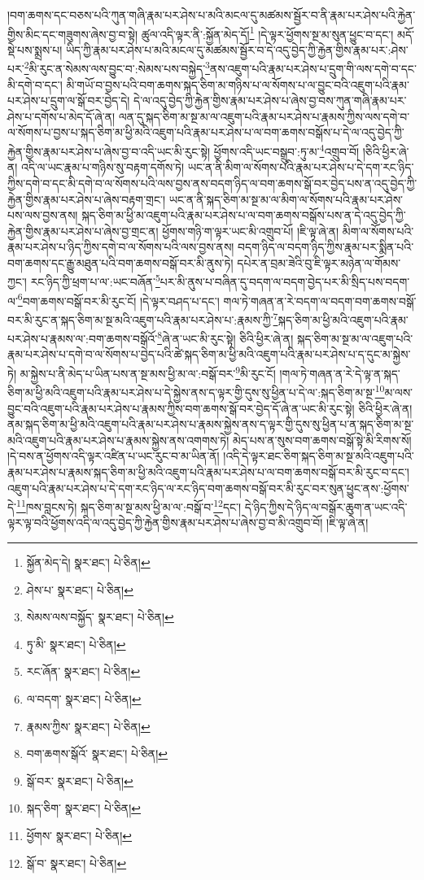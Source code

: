 །བག་ཆགས་དང་བཅས་པའི་ཀུན་གཞི་རྣམ་པར་ཤེས་པ་མའི་མངལ་དུ་མཚམས་སྦྱོར་བ་ནི་རྣམ་པར་ཤེས་པའི་རྐྱེན་གྱིས་མིང་དང་གཟུགས་ཞེས་བྱ་བ་སྟེ། ཚུལ་འདི་ལྟར་ནི་:སྐྱོན་མེད་དོ།\footnote{སྐྱོན་མེད་དེ།  སྣར་ཐང་།  པེ་ཅིན། } །དེ་ལྟར་ཕྱོགས་སྔ་མ་སུན་ཕྱུང་བ་དང་། མདོ་སྡེ་པས་སྨྲས་པ། ཡིད་ཀྱི་རྣམ་པར་ཤེས་པ་མའི་མངལ་དུ་མཚམས་སྦྱོར་བ་དེ་འདུ་བྱེད་ཀྱི་རྐྱེན་གྱིས་རྣམ་པར་:ཤེས་པར་\footnote{ཤེས་པ་  སྣར་ཐང་།  པེ་ཅིན། }མི་རུང་ན་སེམས་ལས་བྱུང་བ་:སེམས་པས་བསྐྱེད་\footnote{སེམས་ལས་བསྐྱོད་  སྣར་ཐང་།  པེ་ཅིན། }ནས་འཇུག་པའི་རྣམ་པར་ཤེས་པ་དྲུག་གི་ལས་དགེ་བ་དང་མི་དགེ་བ་དང་། མི་གཡོ་བ་བྱས་པའི་བག་ཆགས་སྐད་ཅིག་མ་གཉིས་པ་ལ་སོགས་པ་ལ་བྱུང་བའི་འཇུག་པའི་རྣམ་པར་ཤེས་པ་དྲུག་ལ་སྒོ་བར་བྱེད་དེ། དེ་ལ་འདུ་བྱེད་ཀྱི་རྐྱེན་གྱིས་རྣམ་པར་ཤེས་པ་ཞེས་བྱ་བས་ཀུན་གཞི་རྣམ་པར་ཤེས་པ་དགོས་པ་མེད་དོ་ཞེ་ན། ལན་དུ་སྐད་ཅིག་མ་སྔ་མ་ལ་འཇུག་པའི་རྣམ་པར་ཤེས་པ་རྣམས་ཀྱིས་ལས་དགེ་བ་ལ་སོགས་པ་བྱས་པ་སྐད་ཅིག་མ་ཕྱི་མའི་འཇུག་པའི་རྣམ་པར་ཤེས་པ་ལ་བག་ཆགས་བསྒོས་པ་དེ་ལ་འདུ་བྱེད་ཀྱི་རྐྱེན་གྱིས་རྣམ་པར་ཤེས་པ་ཞེས་བྱ་བ་འདི་ཡང་མི་རུང་སྟེ། ཕྱོགས་འདི་ཡང་བསྒྲུབ་:ཏུ་མ་\footnote{ཏུ་མི་  སྣར་ཐང་།  པེ་ཅིན། }འགྲུབ་བོ། །ཅིའི་ཕྱིར་ཞེ་ན། འདི་ལ་ཡང་རྣམ་པ་གཉིས་སུ་བརྟག་དགོས་ཏེ། ཡང་ན་ནི་མིག་ལ་སོགས་པའི་རྣམ་པར་ཤེས་པ་དེ་དག་རང་ཉིད་ཀྱིས་དགེ་བ་དང་མི་དགེ་བ་ལ་སོགས་པའི་ལས་བྱས་ནས་བདག་ཉིད་ལ་བག་ཆགས་སྒོ་བར་བྱེད་པས་ན་འདུ་བྱེད་ཀྱི་རྐྱེན་གྱིས་རྣམ་པར་ཤེས་པ་ཞེས་བརྟག་གྲང་། ཡང་ན་ནི་སྐད་ཅིག་མ་སྔ་མ་ལ་མིག་ལ་སོགས་པའི་རྣམ་པར་ཤེས་པས་ལས་བྱས་ནས། སྐད་ཅིག་མ་ཕྱི་མ་འཇུག་པའི་རྣམ་པར་ཤེས་པ་ལ་བག་ཆགས་བསྒོས་པས་ན་དེ་འདུ་བྱེད་ཀྱི་རྐྱེན་གྱིས་རྣམ་པར་ཤེས་པ་ཞེས་བྱ་གྲང་ན། ཕྱོགས་གཉི་ག་ལྟར་ཡང་མི་འགྲུབ་པོ། །ཇི་ལྟ་ཞེ་ན། མིག་ལ་སོགས་པའི་རྣམ་པར་ཤེས་པ་ཉིད་ཀྱིས་དགེ་བ་ལ་སོགས་པའི་ལས་བྱས་ནས། བདག་ཉིད་ལ་བདག་ཉིད་ཀྱིས་རྣམ་པར་སྨིན་པའི་བག་ཆགས་དང་རྒྱུ་མཐུན་པའི་བག་ཆགས་བསྒོ་བར་མི་ནུས་ཏེ། དཔེར་ན་བྲམ་ཟེའི་བུ་ཇི་ལྟར་མཉེན་ལ་གོམས་ཀྱང་། རང་ཉིད་ཀྱི་ཕྲག་པ་ལ་:ཡང་བཞོན་\footnote{རང་ཞོན་  སྣར་ཐང་།  པེ་ཅིན། }པར་མི་ནུས་པ་བཞིན་དུ་བདག་ལ་བདག་བྱེད་པར་མི་སྲིད་པས་བདག་ལ་\footnote{ལ་བདག་  སྣར་ཐང་།  པེ་ཅིན། }བག་ཆགས་བསྒོ་བར་མི་རུང་ངོ། །དེ་ལྟར་བཤད་པ་དང་། གལ་ཏེ་གཞན་ན་རེ་བདག་ལ་བདག་བག་ཆགས་བསྒོ་བར་མི་རུང་ན་སྐད་ཅིག་མ་སྔ་མའི་འཇུག་པའི་རྣམ་པར་ཤེས་པ་:རྣམས་ཀྱི་\footnote{རྣམས་ཀྱིས་  སྣར་ཐང་།  པེ་ཅིན། }སྐད་ཅིག་མ་ཕྱི་མའི་འཇུག་པའི་རྣམ་པར་ཤེས་པ་རྣམས་ལ་:བག་ཆགས་བསྒོའོ་\footnote{བག་ཆགས་སྒོའོ་  སྣར་ཐང་།  པེ་ཅིན། }ཞེ་ན་ཡང་མི་རུང་སྟེ། ཅིའི་ཕྱིར་ཞེ་ན། སྐད་ཅིག་མ་སྔ་མ་ལ་འཇུག་པའི་རྣམ་པར་ཤེས་པ་དགེ་བ་ལ་སོགས་པ་བྱེད་པའི་ཚེ་སྐད་ཅིག་མ་ཕྱི་མའི་འཇུག་པའི་རྣམ་པར་ཤེས་པ་ད་དུང་མ་སྐྱེས་ཏེ། མ་སྐྱེས་པ་ནི་མེད་པ་ཡིན་པས་ན་སྔ་མས་ཕྱི་མ་ལ་:བསྒོ་བར་\footnote{སྒོ་བར་  སྣར་ཐང་།  པེ་ཅིན། }མི་རུང་ངོ། །གལ་ཏེ་གཞན་ན་རེ་དེ་ལྟ་ན་སྐད་ཅིག་མ་ཕྱི་མའི་འཇུག་པའི་རྣམ་པར་ཤེས་པ་དེ་སྐྱེས་ནས་ད་ལྟར་གྱི་དུས་སུ་ཕྱིན་པ་དེ་ལ་:སྐད་ཅིག་མ་སྔ་\footnote{སྐད་ཅིག་  སྣར་ཐང་།  པེ་ཅིན། }མ་ལས་བྱུང་བའི་འཇུག་པའི་རྣམ་པར་ཤེས་པ་རྣམས་ཀྱིས་བག་ཆགས་སྒོ་བར་བྱེད་དོ་ཞེ་ན་ཡང་མི་རུང་སྟེ། ཅིའི་ཕྱིར་ཞེ་ན། ནམ་སྐད་ཅིག་མ་ཕྱི་མའི་འཇུག་པའི་རྣམ་པར་ཤེས་པ་རྣམས་སྐྱེས་ནས་ད་ལྟར་གྱི་དུས་སུ་ཕྱིན་པ་ན་སྐད་ཅིག་མ་སྔ་མའི་འཇུག་པའི་རྣམ་པར་ཤེས་པ་རྣམས་སྐྱེས་ནས་འགགས་ཏེ། མེད་པས་ན་སུས་བག་ཆགས་བསྒོ་སྟེ་མི་རིགས་སོ། །དེ་བས་ན་ཕྱོགས་འདི་ལྟར་འཛིན་པ་ཡང་རུང་བ་མ་ཡིན་ནོ། །འདི་དེ་ལྟར་ཐང་ཅིག་སྐད་ཅིག་མ་སྔ་མའི་འཇུག་པའི་རྣམ་པར་ཤེས་པ་རྣམས་སྐད་ཅིག་མ་ཕྱི་མའི་འཇུག་པའི་རྣམ་པར་ཤེས་པ་ལ་བག་ཆགས་བསྒོ་བར་མི་རུང་བ་དང་། འཇུག་པའི་རྣམ་པར་ཤེས་པ་དེ་དག་རང་ཉིད་ལ་རང་ཉིད་བག་ཆགས་བསྒོ་བར་མི་རུང་བར་སུན་ཕྱུང་ནས་:ཕྱོགས་དེ་\footnote{ཕྱོགས་  སྣར་ཐང་།  པེ་ཅིན། }ཁས་བླངས་ཏེ། སྐད་ཅིག་མ་སྔ་མས་ཕྱི་མ་ལ་:བསྒོ་བ་\footnote{སྒོ་བ་  སྣར་ཐང་།  པེ་ཅིན། }དང་། དེ་ཉིད་ཀྱིས་དེ་ཉིད་ལ་བསྒོར་ཆུག་ན་ཡང་འདི་ལྟར་ལྟ་བའི་ཕྱོགས་འདི་ལ་འདུ་བྱེད་ཀྱི་རྐྱེན་གྱིས་རྣམ་པར་ཤེས་པ་ཞེས་བྱ་བ་མི་འགྲུབ་བོ། །ཇི་ལྟ་ཞེ་ན། 